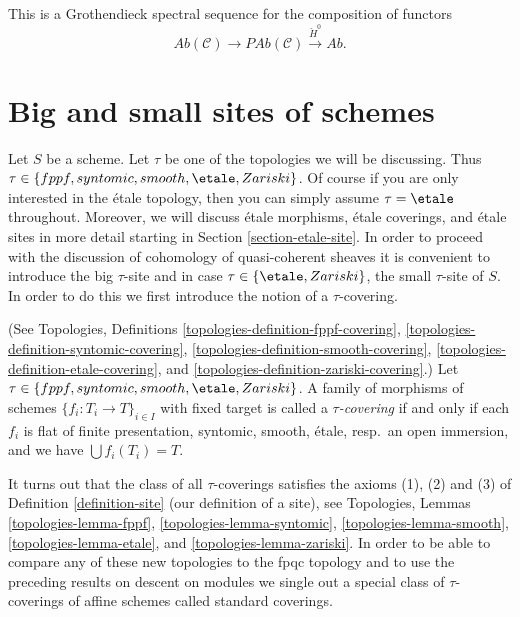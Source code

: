 \begin{remark}
\label{remark-grothendieck-ss}
This is a Grothendieck spectral sequence for the composition of functors
$$
\textit{Ab}(\mathcal{C}) \longrightarrow
\textit{PAb}(\mathcal{C}) \xrightarrow{\check H^0} \textit{Ab}.
$$
\end{remark}








\section{Big and small sites of schemes}
\label{section-big-small}

\noindent
Let $S$ be a scheme.
Let $\tau$ be one of the topologies we will be discussing.
Thus $\tau \in \{fppf, syntomic, smooth, \etale, Zariski\}$.
Of course if you are only interested in the \'etale topology, then
you can simply assume $\tau = \etale$ throughout. Moreover, we will
discuss \'etale morphisms, \'etale coverings, and \'etale sites
in more detail starting in Section \ref{section-etale-site}.
In order to proceed with the discussion of cohomology of
quasi-coherent sheaves it is convenient to introduce the
big $\tau$-site and in case $\tau \in \{\etale, Zariski\}$, the
small $\tau$-site of $S$. In order to do this we first introduce
the notion of a $\tau$-covering.

\begin{definition}
\label{definition-tau-covering}
(See
Topologies, Definitions
\ref{topologies-definition-fppf-covering},
\ref{topologies-definition-syntomic-covering},
\ref{topologies-definition-smooth-covering},
\ref{topologies-definition-etale-covering}, and
\ref{topologies-definition-zariski-covering}.)
Let $\tau \in \{fppf, syntomic, smooth, \etale, Zariski\}$.
A family of morphisms of schemes $\{f_i : T_i \to T\}_{i \in I}$ with fixed
target is called a {\it $\tau$-covering} if and only if
each $f_i$ is flat of finite presentation, syntomic, smooth, \'etale,
resp.\ an open immersion, and we have $\bigcup f_i(T_i) = T$.
\end{definition}

\noindent
It turns out that the class of all $\tau$-coverings satisfies the axioms
(1), (2) and (3) of
Definition \ref{definition-site} (our definition of a site), see
Topologies, Lemmas
\ref{topologies-lemma-fppf},
\ref{topologies-lemma-syntomic},
\ref{topologies-lemma-smooth},
\ref{topologies-lemma-etale}, and
\ref{topologies-lemma-zariski}.
In order to be able to compare any of these new topologies to the fpqc topology
and to use the preceding results on descent on modules we single out a special
class of $\tau$-coverings of affine schemes called standard coverings.

